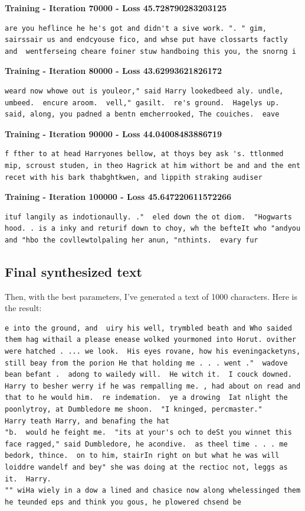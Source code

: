 \documentclass{article}
\begin{document}
\textbf{Training - Iteration 70000 - Loss 45.728790283203125}
\begin{lstlisting}[breaklines=true]
    are you heflince he he's got and didn't a sive work. ". " gim, sairssair us and endcyouse fico, and whse put have clossarts factly and  wentferseing cheare foiner stuw handboing this you, the snorng i
\end{lstlisting}
\textbf{Training - Iteration 80000 - Loss 43.62993621826172}
\begin{lstlisting}[breaklines=true]
    weard now whowe out is youleor," said Harry lookedbeed aly. undle, umbeed.  encure aroom.  vell," gasilt.  re's ground.  Hagelys up.  said, along, you padned a bentn emcherrooked, The couiches.  eave
\end{lstlisting}
\textbf{Training - Iteration 90000 - Loss 44.04008483886719}
\begin{lstlisting}[breaklines=true]
    f fther to at head Harryones bellow, at thoys bey ask 's. ttlonmed mip, scroust studen, in theo Hagrick at him withort be and and the ent recet with his bark thabghtkwen, and lippith straking audiser
\end{lstlisting}
\textbf{Training - Iteration 100000 - Loss 45.647220611572266}
\begin{lstlisting}[breaklines=true]
    ituf langily as indotionaully. ."  eled down the ot diom.  "Hogwarts hood. . is a inky and returif down to choy, wh the befteIt who "andyou and "hbo the covllewtolpaling her anun, "nthints.  evary fur
\end{lstlisting}

\subsection*{Final synthesized text}

Then, with the best parameters, I've generated a text of 1000 characters. Here is the result:
\begin{lstlisting}[breaklines=true]
e into the ground, and  uiry his well, trymbled beath and Who saided them hag withail a please enease wolked yourmoned into Horut. ovither were hatched . ... we look.  His eyes rovane, how his eveningacketyns, still beay from the porion He that holding me . . . went ."  wadove bean befant .  adong to wailedy will.  He witch it.  I couck downed.  Harry to besher werry if he was rempalling me. , had about on read and that to he would him.  re indemation.  ye a drowing  Iat nlight the poonlytroy, at Dumbledore me shoon.  "I kninged, percmaster."
Harry teath Harry, and benafing the hat 
"b.  would he feight me.  "its at your's och to deSt you winnet this face ragged," said Dumbledore, he acondive.  as theel time . . . me bedork, thince.  on to him, stairIn right on but what he was will loiddre wandelf and bey" she was doing at the rectioc not, leggs as it.  Harry.
"" wiHa wiely in a dow a lined and chasice now along whelessinged them he teunded eps and think you gous, he plowered chsend be
\end{lstlisting}
\end{document}
